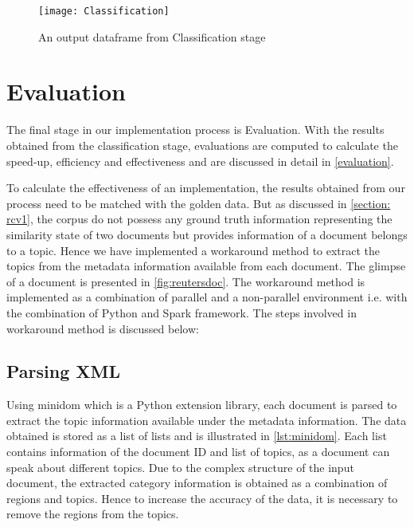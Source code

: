 \begin{figure}[htbp]
	\centering
		\texttt{[image: Classification]}
	\caption{An output dataframe from Classification stage }
	\label{fig: classification}
\end{figure}

\section{Evaluation}
\label{implement:evaluation}

The final stage in our implementation process is Evaluation. With the results obtained from the classification stage, evaluations are computed to calculate the speed-up, efficiency and effectiveness and are discussed in detail in \ref{evaluation}. 

\par To calculate the effectiveness of an implementation, the results obtained from our process need to be matched with the golden data. But as discussed in \ref{section: rcv1}, the corpus do not possess any ground truth information representing the similarity state of two documents but provides information of a document belongs to a topic. Hence we have implemented a workaround method to extract the topics from the metadata information available from each document. The glimpse of a document is presented in \ref{fig:reutersdoc}. The workaround method is implemented as a combination of parallel and a non-parallel environment i.e. with the combination of Python and Spark framework. The steps involved in workaround method is discussed below:


\subsection{Parsing XML}
\par Using minidom \cite{website:minidom} which is a Python extension library, each document is parsed to extract the topic information available under the metadata information. The data obtained is stored as a list of lists and is illustrated in \ref{lst:minidom}. Each list contains information of the document ID and list of topics, as a document can speak about different topics. Due to the complex structure of the input document, the extracted category information is obtained as a combination of regions and topics. Hence to increase the accuracy of the data, it is necessary to remove the regions from the topics.

